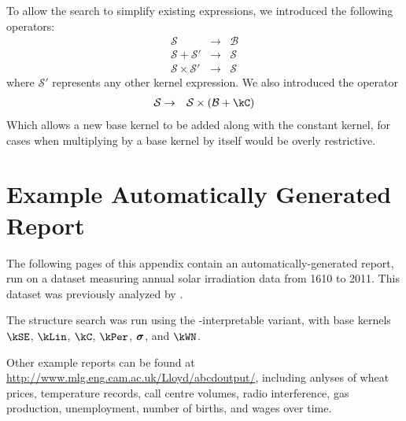To allow the search to simplify existing expressions, we introduced the following operators:
%
\begin{eqnarray}
\mathcal{S} &\to& \mathcal{B}\\
\mathcal{S} + \mathcal{S'} &\to& \mathcal{S}\\
\mathcal{S} \times \mathcal{S'} &\to& \mathcal{S}
\end{eqnarray}
%
where $\mathcal{S'}$ represents any other kernel expression.
We also introduced the operator
%
\begin{eqnarray}
\mathcal{S} &\to& \mathcal{S} \times (\mathcal{B} + \kC)
\end{eqnarray}
%
Which allows a new base kernel to be added along with the constant kernel, for cases when multiplying by a base kernel by itself would be overly restrictive.





\chapter{Example Automatically Generated Report}
\label{ch:example-solar}

The following pages of this appendix contain an automatically-generated report, run on a dataset measuring annual solar irradiation data from 1610 to 2011.
This dataset was previously analyzed by \citet{lean1995reconstruction}.

The structure search was run using the \procedurename-interpretable variant, with base kernels $\kSE$, $\kLin$, $\kC$, $\kPer$, ${\boldsymbol{\sigma}}$, and $\kWN$.

Other example reports can be found at \url{http://www.mlg.eng.cam.ac.uk/Lloyd/abcdoutput/}, including anlyses of wheat prices, temperature records, call centre volumes, radio interference, gas production, unemployment, number of births, and wages over time.

\newcommand{\solarreportpage}[1]{\texttt{[image: figures/solarpages/02-solar-seperate-pages-\#1]}}

\clearpage


